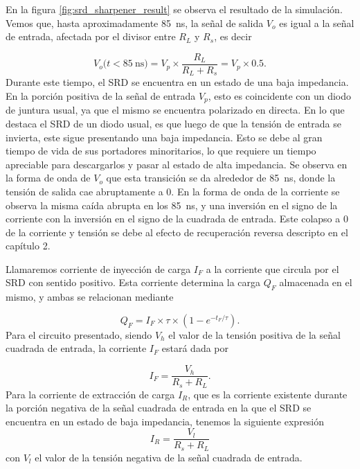 En la figura \ref{fig:srd_sharpener_result} se observa el resultado de la
simulación. Vemos que, hasta aproximadamente \qty{85}{\nano\second}, la señal de
salida $V_o$ es igual a la señal de entrada, afectada por el divisor entre $R_L$
y $R_s$, es decir

\begin{equation}
    V_o(t < \qty{85}{\nano\second)} = V_p \times \frac{R_L}{R_L+R_s} = V_p
    \times 0.5.
\end{equation}
Durante este tiempo, el SRD se encuentra en un estado de una baja impedancia. En
la porción positiva de la señal de entrada $V_p$, esto es coincidente con un
diodo de juntura usual, ya que el mismo se encuentra polarizado en directa. En
lo que destaca el SRD de un diodo usual, es que luego de que la tensión de
entrada se invierta, este sigue presentando una baja impedancia. Esto se debe al
gran tiempo de vida de sus portadores minoritarios, lo que requiere un tiempo
apreciable para descargarlos y pasar al estado de alta impedancia. Se observa en
la forma de onda de $V_o$ que esta transición se da alrededor de
\qty{85}{\nano\second}, donde la tensión de salida cae abruptamente a $0$. En la
forma de onda de la corriente se observa la misma caída abrupta en los
\qty{85}{\nano\second}, y una inversión en el signo de la corriente con la
inversión en el signo de la cuadrada de entrada. Este colapso a $0$ de la
corriente y tensión se debe al efecto de recuperación reversa descripto en el
capítulo 2.

Llamaremos corriente de inyección de carga $I_F$ a la corriente que circula por
el SRD con sentido positivo. Esta corriente determina la carga
$Q_F$ almacenada en el mismo, y ambas se relacionan mediante \cite{an918}
\cite{moll1969}

\begin{equation}
    Q_F = I_F \times \tau \times \left( 1 - e^{-t_F/\tau}\right).
\end{equation}
Para el circuito presentado, siendo $V_h$ el valor de la tensión positiva de
la señal cuadrada de entrada, la corriente $I_F$ estará dada por

\begin{equation}
    I_{F} = \frac{V_h}{R_s+R_L}.
\end{equation}
Para la corriente de extracción de carga $I_R$, que es la corriente existente
durante la porción negativa de la señal cuadrada de entrada en la que el
SRD se encuentra en un estado de baja impedancia, tenemos la siguiente
expresión
\begin{equation}
    I_{R} = \frac{V_l}{R_s+R_L}
\end{equation}
con $V_l$ el valor de la tensión negativa de la señal cuadrada de entrada.


